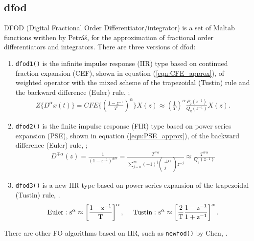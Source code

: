 \documentclass[11pt]{tCON2e}
\theoremstyle{plain}\newtheorem{theorem}{Theorem}
\theoremstyle{definition}
\theoremstyle{remark}
\begin{document}
\subsection{dfod}
DFOD (Digital Fractional Order Differentiator/integrator) is a set of Maltab functions writhen by Petr\'{a}\v{s}, for the approximation of fractional order differentiators and integrators.
There are three versions of dfod:
\begin{enumerate}
    \item {\tt dfod1()} is the infinite impulse response (IIR) type based on continued fraction expansion (CEF), shown in equation (\ref{eqn:CFE_approx}), of weighted operator with the mixed scheme of the trapezoidal (Tustin) rule and the backward difference (Euler) rule, \cite{ref:Petras_dfod1};
        \begin{eqnarray}
        \label{eqn:CFE_approx}
        Z\{D^{\alpha} x(t)\} = CFE\{(\frac{1-z^{-1}}{T})^{\alpha}\}X(z) \approx (\frac{1}{T})^{\alpha}\frac{P_p(z^{-1})}{Q_q(z^{-1})} X(z).
        \end{eqnarray}
    \item {\tt dfod2()} is the finite impulse response (FIR) type based on power series expansion (PSE), shown in equation (\ref{eqn:PSE_approx}), of the backward difference (Euler) rule, \cite{ref:Petras_dfod2};
        \begin{eqnarray}
        \label{eqn:PSE_approx}
        {D^{ \mp \alpha }}(z) = \frac{1}{{{{(1 - {z^{ - 1}})}^{ \pm \alpha }}}} = \frac{{{T^{ \mp \alpha }}}}{{\sum\limits_{j = 0}^\infty  {{{( - 1)}^j}\left(\!\!\! {\begin{array}{*{20}{c}}
        { \pm \alpha }\\
        j
        \end{array}}\!\!\! \right){z^{ - j}}} }} \approx \frac{{{T^{ \mp \alpha }}}}{{{Q_q}({z^{ - 1}})}}
        \end{eqnarray}
    \item {\tt dfod3()} is a new IIR type based on power series expansion of the trapezoidal (Tustin) rule, \cite{ref:Petras_dfod3}.
    \begin{eqnarray}
    \rm{Euler:} \ s^{\alpha} \approx \left[\frac{1-z^{-1}}{T}\right]^{\alpha}, \ \  \ \ \rm{Tustin:} \ s^{\alpha} \approx \left[\frac{2}{T}\frac{1-z^{-1}}{1+z^{-1}}\right]^{\alpha}.
    \end{eqnarray}
\end{enumerate}


\noindent
There are other FO algorithms based on IIR, such as {\tt newfod()} by Chen, \cite{ref:Chen_IIR}.
\end{document}
